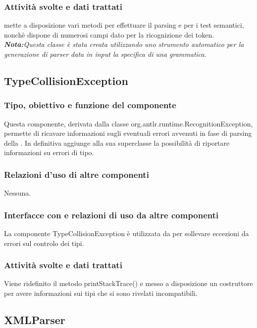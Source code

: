 \documentclass[11pt,titlepage,a4paper]{report}
\begin{document}
\subsubsection{Attivit\`a svolte e dati trattati}
\brp mette a disposizione vari metodi per effettuare il parsing e per i test semantici, nonch\`e dispone di numerosi campi dato per la ricognizione dei token.\\
\textit{\textbf{Nota:}Questa classe \`e stata creata utilizzando uno strumento automatico per la generazione di parser data in input la specifica di una grammatica.}

\subsection{TypeCollisionException}
\subsubsection{Tipo, obiettivo e funzione del componente}
Questa componente, derivata dalla classe org.antlr.runtime.RecognitionException, permette di ricavare informazioni sugli eventuali errori avvenuti in fase di parsing della \br. In definitiva aggiunge alla sua superclasse la possibilit\`a di riportare informazioni su errori di tipo.
\subsubsection{Relazioni d'uso di altre componenti}
Nessuna.
\subsubsection{Interfacce con e relazioni di uso da altre componenti}
La componente TypeCollisionException \`e utilizzata da \brp per sollevare eccezioni da errori sul controlo dei tipi.
\subsubsection{Attivit\`a svolte e dati trattati}
Viene ridefinito il metodo printStackTrace() e messo a disposizione un costruttore per avere informazioni sui tipi che si sono rivelati incompatibili.

\subsection{XMLParser}%
\end{document}
